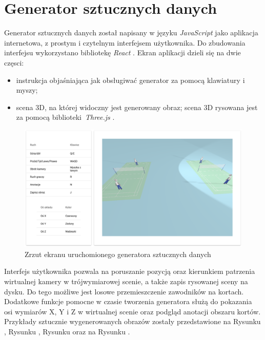 \newpage
\section{Generator sztucznych danych}

Generator sztucznych danych został napisany w języku \textit{JavaScript} jako aplikacja internetowa, z prostym i czytelnym interfejsem użytkownika.
Do zbudowania interfejsu wykorzystano bibliotekę \textit{React} \cite{react}.
Ekran aplikacji dzieli się na dwie częsci:
\begin{itemize}
  \item instrukcja objaśniająca jak obsługiwać generator za pomocą klawiatury i myszy;
  \item scena 3D, na której widoczny jest generowany obraz; scena 3D rysowana jest za pomocą biblioteki~\textit{Three.js} \cite{threejs}.
\end{itemize}

\begin{figure}[!htb]
  \includegraphics[width=\linewidth]{./generator_3.png}
    \caption{Zrzut ekranu uruchomionego generatora sztucznych danych}
\end{figure}

Interfejs użytkownika pozwala na poruszanie pozycją oraz kierunkiem patrzenia wirtualnej kamery w trójwymiarowej scenie, a także zapis rysowanej sceny na dysku. Do tego możliwe jest losowe przemieszczenie zawodników na kortach. Dodatkowe funkcje pomocne w czasie tworzenia generatora służą do pokazania osi wymiarów X, Y i Z w wirtualnej scenie oraz podgląd anotacji obszaru kortów. Przykłady sztucznie wygenerowanych obrazów zostały przedstawione na Rysunku , Rysunku , Rysunku  oraz na Rysunku .
